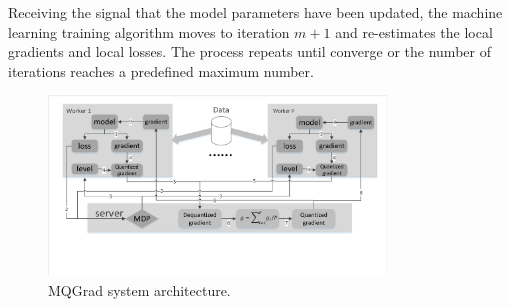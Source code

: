\documentclass[sigconf]{acmart}
\begin{document}
Receiving the signal that the model parameters have been updated, the machine learning training algorithm moves to iteration $m+1$ and re-estimates the local gradients and local losses. The process repeats until converge or the number of iterations reaches a predefined maximum number.






\begin{figure}[hbt]
	\begin{center}
		\includegraphics[width=0.8\textwidth]{mdp_arch.pdf}
	\end{center}
	\caption{MQGrad system architecture.}\label{fig:MQGradArch}
\end{figure}
\end{document}
